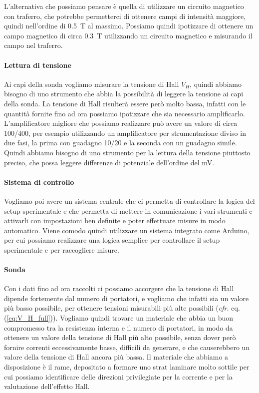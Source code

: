 \documentclass[fleqn,varvw,preprintnumbers]{memo}
\begin{document}
L'alternativa che possiamo pensare è quella di utilizzare un circuito magnetico con traferro, che potrebbe permetterci di ottenere campi di intensità maggiore, quindi nell'ordine di \SI{0.5}{\tesla} al massimo. Possiamo quindi ipotizzare di ottenere un campo magnetico di circa \SI{0.3}{\tesla} utilizzando un circuito magnetico e misurando il campo nel traferro.

\paragraph{Lettura di tensione} Ai capi della sonda vogliamo misurare la tensione di Hall $V_H$, quindi abbiamo bisogno di uno strumento che abbia la possibilità di leggere la tensione ai capi della sonda. La tensione di Hall risulterà essere però molto bassa, infatti con le quantità fornite fino ad ora possiamo ipotizzare che sia necessario amplificarlo. L'amplificatore migliore che possiamo realizzare può avere un valore di circa 100/400, per esempio utilizzando un amplificatore per strumentazione diviso in due fasi, la prima con guadagno 10/20 e la seconda con un guadagno simile. Quindi abbiamo bisogno di uno strumento per la lettura della tensione piuttosto preciso, che possa leggere differenze di potenziale dell'ordine del \si{\milli\volt}. 

\paragraph{Sistema di controllo} Vogliamo poi avere un sistema centrale che ci permetta di controllare la logica del setup sperimentale e che permetta di mettere in comunicazione i vari strumenti e attivarli con impostazioni ben definite e poter effettuare misure in modo automatico. Viene comodo quindi utilizzare un sistema integrato come Arduino, per cui possiamo realizzare una logica semplice per controllare il setup sperimentale e per raccogliere misure. 

\paragraph{Sonda} Con i dati fino ad ora raccolti ci possiamo accorgere che la tensione di Hall dipende fortemente dal numero di portatori, e vogliamo che infatti sia un valore più basso possibile, per ottenere tensioni misurabili più alte possibili (\emph{cfr.} eq. (\ref{eq:V_H_full})). Vogliamo quindi trovare un materiale che abbia un buon compromesso tra la resistenza interna e il numero di portatori, in modo da ottenere un valore della tensione di Hall più alto possibile, senza dover però fornire correnti eccessivamente basse, difficili da generare, e che causerebbero un valore della tensione di Hall ancora più bassa. Il materiale che abbiamo a disposizione è il rame, depositato a formare uno strat laminare molto sottile per cui possiamo identificare delle direzioni privilegiate per la corrente e per la valutazione dell'effetto Hall. 
\end{document}
